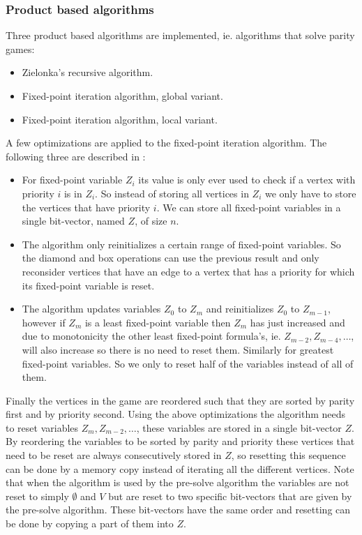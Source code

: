 \subsubsection{Product based algorithms}
Three product based algorithms are implemented, ie. algorithms that solve parity games:
\begin{itemize}
	\item Zielonka's recursive algorithm.
	\item Fixed-point iteration algorithm, global variant.
	\item Fixed-point iteration algorithm, local variant.
\end{itemize}
A few optimizations are applied to the fixed-point iteration algorithm. The following three are described in \cite{FPITE}:
\begin{itemize}
	\item For fixed-point variable $Z_i$ its value is only ever used to check if a vertex with priority $i$ is in $Z_i$. So instead of storing all vertices in $Z_i$ we only have to store the vertices that have priority $i$. We can store all fixed-point variables in a single bit-vector, named $Z$, of size $n$.
	\item The algorithm only reinitializes a certain range of fixed-point variables. So the diamond and box operations can use the previous result and only reconsider vertices that have an edge to a vertex that has a priority for which its fixed-point variable is reset.
	\item The algorithm updates variables $Z_0$ to $Z_m$ and reinitializes $Z_0$ to $Z_{m-1}$, however if $Z_m$ is a least fixed-point variable then $Z_m$ has just increased and due to monotonicity the other least fixed-point formula's, ie. $Z_{m-2},Z_{m-4},\dots$, will also increase so there is no need to reset them. Similarly for greatest fixed-point variables. So we only to reset half of the variables instead of all of them.
\end{itemize}
Finally the vertices in the game are reordered such that they are sorted by parity first and by priority second. Using the above optimizations the algorithm needs to reset variables $Z_{m}, Z_{m-2},\dots$, these variables are stored in a single bit-vector $Z$. By reordering the variables to be sorted by parity and priority these vertices that need to be reset are always consecutively stored in $Z$, so resetting this sequence can be done by a memory copy instead of iterating all the different vertices. Note that when the algorithm is used by the pre-solve algorithm the variables are not reset to simply $\emptyset$ and $V$ but are reset to two specific bit-vectors that are given by the pre-solve algorithm. These bit-vectors have the same order and resetting can be done by copying a part of them into $Z$.

